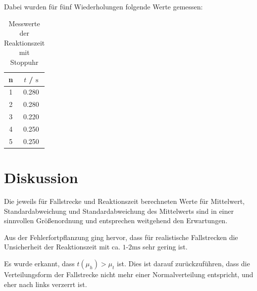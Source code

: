 \documentclass[a4paper,12pt]{article}
\begin{document}
Dabei wurden für fünf Wiederholungen folgende Werte gemessen:

\begin{table}[H]
    \centering
    \label{Tab:StoppuhrVersuch}
    \begin{tabular}{|c|c|}
        \hline
        n & $t$ / $\mathrm{s}$ \\
        \hline
        1 & 0.280 \\
        2 & 0.280 \\
        3 & 0.220 \\
        4 & 0.250 \\
        5 & 0.250 \\
        \hline
    \end{tabular}
    \caption{Messwerte der Reaktionszeit mit Stoppuhr}
\end{table}


\section{Diskussion}

Die jeweils für Fallstrecke und Reaktionszeit berechneten Werte für Mittelwert, Standardabweichung und
Standardabweichung des Mittelwerts sind in einer sinnvollen Größenordnung und entsprechen weitgehend den Erwartungen.

Aus der Fehlerfortpflanzung ging hervor, dass für realistische Fallstrecken die Unsicherheit der Reaktionszeit
mit ca. $1$-$2\mathrm{ms}$ sehr gering ist.

Es wurde erkannt, dass $t(\mu_h)>\mu_t$ ist. Dies ist darauf zurückzuführen, dass die Verteilungsform
der Fallstrecke nicht mehr einer Normalverteilung entspricht, und eher nach links verzerrt ist.
\end{document}
